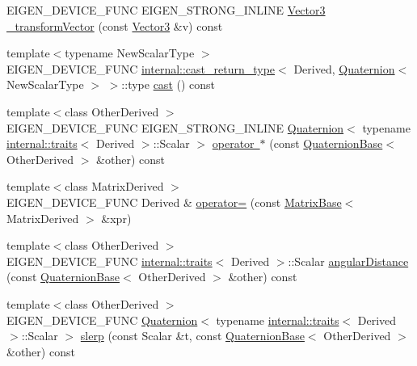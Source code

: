 \begin{DoxyCompactItemize}
\item 
E\+I\+G\+E\+N\+\_\+\+D\+E\+V\+I\+C\+E\+\_\+\+F\+U\+NC E\+I\+G\+E\+N\+\_\+\+S\+T\+R\+O\+N\+G\+\_\+\+I\+N\+L\+I\+NE \mbox{\hyperlink{class_eigen_1_1_quaternion_base_a974c0529d55983b0b3a6d99a8466f331}{Vector3}} \mbox{\hyperlink{class_eigen_1_1_quaternion_base_a03896e1e743aae2c18a0146086cef983}{\+\_\+transform\+Vector}} (const \mbox{\hyperlink{class_eigen_1_1_quaternion_base_a974c0529d55983b0b3a6d99a8466f331}{Vector3}} \&v) const
\item 
{\footnotesize template$<$typename New\+Scalar\+Type $>$ }\\E\+I\+G\+E\+N\+\_\+\+D\+E\+V\+I\+C\+E\+\_\+\+F\+U\+NC \mbox{\hyperlink{struct_eigen_1_1internal_1_1cast__return__type}{internal\+::cast\+\_\+return\+\_\+type}}$<$ Derived, \mbox{\hyperlink{class_eigen_1_1_quaternion}{Quaternion}}$<$ New\+Scalar\+Type $>$ $>$\+::type \mbox{\hyperlink{class_eigen_1_1_quaternion_base_a0ba6cd48ef9b2d850eb99bfaf27474de}{cast}} () const
\item 
{\footnotesize template$<$class Other\+Derived $>$ }\\E\+I\+G\+E\+N\+\_\+\+D\+E\+V\+I\+C\+E\+\_\+\+F\+U\+NC E\+I\+G\+E\+N\+\_\+\+S\+T\+R\+O\+N\+G\+\_\+\+I\+N\+L\+I\+NE \mbox{\hyperlink{class_eigen_1_1_quaternion}{Quaternion}}$<$ typename \mbox{\hyperlink{struct_eigen_1_1internal_1_1traits}{internal\+::traits}}$<$ Derived $>$\+::Scalar $>$ \mbox{\hyperlink{class_eigen_1_1_quaternion_base_a48a3eadd7572dba8eed688278fa8868f}{operator $\ast$}} (const \mbox{\hyperlink{class_eigen_1_1_quaternion_base}{Quaternion\+Base}}$<$ Other\+Derived $>$ \&other) const
\item 
{\footnotesize template$<$class Matrix\+Derived $>$ }\\E\+I\+G\+E\+N\+\_\+\+D\+E\+V\+I\+C\+E\+\_\+\+F\+U\+NC Derived \& \mbox{\hyperlink{class_eigen_1_1_quaternion_base_a537abceba3bbb467e961e582877d45cb}{operator=}} (const \mbox{\hyperlink{class_eigen_1_1_matrix_base}{Matrix\+Base}}$<$ Matrix\+Derived $>$ \&xpr)
\item 
{\footnotesize template$<$class Other\+Derived $>$ }\\E\+I\+G\+E\+N\+\_\+\+D\+E\+V\+I\+C\+E\+\_\+\+F\+U\+NC \mbox{\hyperlink{struct_eigen_1_1internal_1_1traits}{internal\+::traits}}$<$ Derived $>$\+::Scalar \mbox{\hyperlink{class_eigen_1_1_quaternion_base_a03ff48b4eac8b8f64af37ed2ce796747}{angular\+Distance}} (const \mbox{\hyperlink{class_eigen_1_1_quaternion_base}{Quaternion\+Base}}$<$ Other\+Derived $>$ \&other) const
\item 
{\footnotesize template$<$class Other\+Derived $>$ }\\E\+I\+G\+E\+N\+\_\+\+D\+E\+V\+I\+C\+E\+\_\+\+F\+U\+NC \mbox{\hyperlink{class_eigen_1_1_quaternion}{Quaternion}}$<$ typename \mbox{\hyperlink{struct_eigen_1_1internal_1_1traits}{internal\+::traits}}$<$ Derived $>$\+::Scalar $>$ \mbox{\hyperlink{class_eigen_1_1_quaternion_base_a0428d9745a54936f05d0aff86a3bb8fd}{slerp}} (const Scalar \&t, const \mbox{\hyperlink{class_eigen_1_1_quaternion_base}{Quaternion\+Base}}$<$ Other\+Derived $>$ \&other) const
\end{DoxyCompactItemize}
